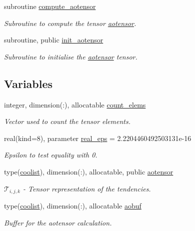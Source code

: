 \begin{DoxyCompactItemize}
subroutine \hyperlink{namespaceaotensor__def_af8d3b24f71f7b03dd5335e20a00c73b4}{compute\+\_\+aotensor}
\begin{DoxyCompactList}\small\item\em Subroutine to compute the tensor \hyperlink{namespaceaotensor__def_a0dc43bc9294a18f2fe57b67489f1702f}{aotensor}. \end{DoxyCompactList}\item 
subroutine, public \hyperlink{namespaceaotensor__def_ac583b298e9b68f84b0a22588d3b7dbcd}{init\+\_\+aotensor}
\begin{DoxyCompactList}\small\item\em Subroutine to initialise the \hyperlink{namespaceaotensor__def_a0dc43bc9294a18f2fe57b67489f1702f}{aotensor} tensor. \end{DoxyCompactList}\end{DoxyCompactItemize}
\subsection*{Variables}
\begin{DoxyCompactItemize}
\item 
integer, dimension(\+:), allocatable \hyperlink{namespaceaotensor__def_aa9e30c84efc5a81409ba9c0286c87eac}{count\+\_\+elems}
\begin{DoxyCompactList}\small\item\em Vector used to count the tensor elements. \end{DoxyCompactList}\item 
real(kind=8), parameter \hyperlink{namespaceaotensor__def_ab1cf9313fb1def1a17de539cfa922e35}{real\+\_\+eps} = 2.\+2204460492503131e-\/16
\begin{DoxyCompactList}\small\item\em Epsilon to test equality with 0. \end{DoxyCompactList}\item 
type(\hyperlink{structtensor_1_1coolist}{coolist}), dimension(\+:), allocatable, public \hyperlink{namespaceaotensor__def_a0dc43bc9294a18f2fe57b67489f1702f}{aotensor}
\begin{DoxyCompactList}\small\item\em $\mathcal{T}_{i,j,k}$ -\/ Tensor representation of the tendencies. \end{DoxyCompactList}\item 
type(\hyperlink{structtensor_1_1coolist}{coolist}), dimension(\+:), allocatable \hyperlink{namespaceaotensor__def_ac1bc60299b01412e33c173869cb08307}{aobuf}
\begin{DoxyCompactList}\small\item\em Buffer for the aotensor calculation. \end{DoxyCompactList}\end{DoxyCompactItemize}


